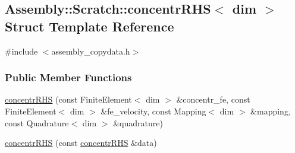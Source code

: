 \hypertarget{struct_assembly_1_1_scratch_1_1concentr_r_h_s}{}\subsection{Assembly\+:\+:Scratch\+:\+:concentr\+R\+H\+S$<$ dim $>$ Struct Template Reference}
\label{struct_assembly_1_1_scratch_1_1concentr_r_h_s}


{\ttfamily \#include $<$assembly\+\_\+copydata.\+h$>$}

\subsubsection*{Public Member Functions}
\begin{DoxyCompactItemize}
\item 
\hyperlink{struct_assembly_1_1_scratch_1_1concentr_r_h_s_af8cd490e71848eda2821fa50503094bc}{concentr\+R\+H\+S} (const Finite\+Element$<$ dim $>$ \&concentr\+\_\+fe, const Finite\+Element$<$ dim $>$ \&fe\+\_\+velocity, const Mapping$<$ dim $>$ \&mapping, const Quadrature$<$ dim $>$ \&quadrature)
\item 
\hyperlink{struct_assembly_1_1_scratch_1_1concentr_r_h_s_a41cd0bab73e9eff227b5f26bd0cf5ac7}{concentr\+R\+H\+S} (const \hyperlink{struct_assembly_1_1_scratch_1_1concentr_r_h_s}{concentr\+R\+H\+S} \&data)
\end{DoxyCompactItemize}
